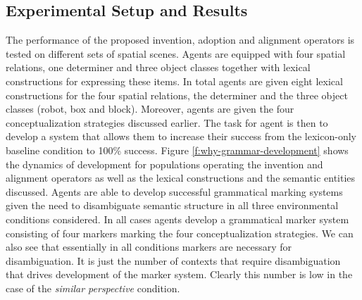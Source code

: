\subsection{Experimental Setup and Results}
The performance of the proposed invention, adoption and 
alignment operators is tested on different sets of spatial scenes. Agents are equipped 
with four spatial relations, one determiner and three object classes together 
with lexical constructions for expressing these items. In total
agents are given eight lexical constructions for the four spatial relations, the 
determiner and the three object classes (robot, box and block). Moreover, 
agents are given the four conceptualization strategies discussed earlier. The task for agent is then to develop a system that allows them to increase their success 
from the lexicon-only baseline condition to 100\% success. Figure 
\ref{f:why-grammar-development} shows the dynamics of development for 
populations operating the invention and alignment operators as well as 
the lexical constructions and the semantic entities discussed. Agents are able 
to develop successful grammatical marking systems given the need 
to disambiguate semantic structure in all three environmental conditions considered. 
In all cases agents develop a grammatical marker system
consisting of four markers marking the four conceptualization strategies. 
We can also see that essentially in all conditions markers are necessary for disambiguation. It is just the number of contexts that require disambiguation 
that drives development of the marker system.
Clearly this number is low in the case of the \emph{similar perspective} condition.



